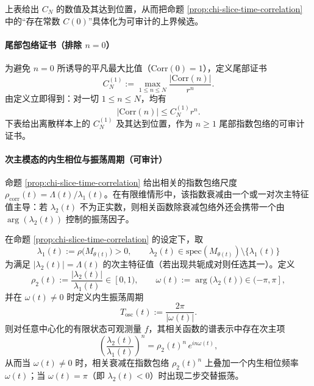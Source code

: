 \label{subsec:chi-ldp-part2}


上表给出 $C_N$ 的数值及其达到位置，从而把命题 \ref{prop:chi-slice-time-correlation} 中的“存在常数 $C(0)$”具体化为可审计的上界候选。

\paragraph{尾部包络证书（排除 $n=0$）}
为避免 $n=0$ 所诱导的平凡最大比值（$\mathrm{Corr}(0)=1$），定义尾部证书
\[
C_N^{(1)}:=\max_{1\le n\le N}\frac{|\mathrm{Corr}(n)|}{r^n}.
\]
由定义立即得到：对一切 $1\le n\le N$，均有
\[
|\mathrm{Corr}(n)|\le C_N^{(1)} r^n.
\]
下表给出离散样本上的 $C_N^{(1)}$ 及其达到位置，作为 $n\ge 1$ 尾部指数包络的可审计证书。


\paragraph{次主模态的内生相位与振荡周期（可审计）}
命题 \ref{prop:chi-slice-time-correlation} 给出相关的指数包络尺度 $\rho_{\mathrm{corr}}(t)=\Lambda(t)/\lambda_1(t)$。在有限维情形中，该指数衰减由一个或一对次主特征值主导：若 $\lambda_2(t)$ 不为正实数，则相关函数除衰减包络外还会携带一个由 $\arg(\lambda_2(t))$ 控制的振荡因子。

\begin{remark}[次主相位与内生振荡周期]
\label{prop:chi-slice-subleading-phase}
在命题 \ref{prop:chi-slice-time-correlation} 的设定下，取
\[
\lambda_1(t):=\rho\bigl(M_{\theta(t)}\bigr)>0,
\qquad
\lambda_2(t)\in\mathrm{spec}(M_{\theta(t)})\setminus\{\lambda_1(t)\}
\]
为满足 $|\lambda_2(t)|=\Lambda(t)$ 的次主特征值（若出现共轭成对则任选其一）。定义
\[
\rho_2(t):=\frac{|\lambda_2(t)|}{\lambda_1(t)}\in[0,1),
\qquad
\omega(t):=\arg\bigl(\lambda_2(t)\bigr)\in(-\pi,\pi],
\]
并在 $\omega(t)\ne 0$ 时定义内生振荡周期
\[
T_{\mathrm{osc}}(t):=\frac{2\pi}{|\omega(t)|}.
\]
则对任意中心化的有限状态可观测量 $f$，其相关函数的谱表示中存在次主项
\[
\left(\frac{\lambda_2(t)}{\lambda_1(t)}\right)^n
=\rho_2(t)^n\,e^{i n\omega(t)},
\]
从而当 $\omega(t)\ne 0$ 时，相关衰减在指数包络 $\rho_2(t)^n$ 上叠加一个内生相位频率 $\omega(t)$；当 $\omega(t)=\pi$（即 $\lambda_2(t)<0$）时出现二步交替振荡。
\end{remark}




